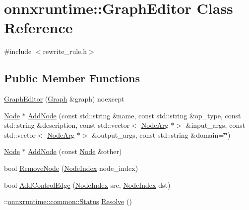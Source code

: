 \hypertarget{classonnxruntime_1_1GraphEditor}{}\section{onnxruntime\+:\+:Graph\+Editor Class Reference}
\label{classonnxruntime_1_1GraphEditor}


{\ttfamily \#include $<$rewrite\+\_\+rule.\+h$>$}

\subsection*{Public Member Functions}
\begin{DoxyCompactItemize}
\item 
\mbox{\hyperlink{classonnxruntime_1_1GraphEditor_a9386ce2eda03c33519102ecd1b1eabbc}{Graph\+Editor}} (\mbox{\hyperlink{classonnxruntime_1_1Graph}{Graph}} \&graph) noexcept
\item 
\mbox{\hyperlink{classonnxruntime_1_1Node}{Node}} $\ast$ \mbox{\hyperlink{classonnxruntime_1_1GraphEditor_aa2d4e6435f26f0661c9c5a8c6efd011e}{Add\+Node}} (const std\+::string \&name, const std\+::string \&op\+\_\+type, const std\+::string \&description, const std\+::vector$<$ \mbox{\hyperlink{classonnxruntime_1_1NodeArg}{Node\+Arg}} $\ast$$>$ \&input\+\_\+args, const std\+::vector$<$ \mbox{\hyperlink{classonnxruntime_1_1NodeArg}{Node\+Arg}} $\ast$$>$ \&output\+\_\+args, const std\+::string \&domain=\char`\"{}\char`\"{})
\item 
\mbox{\hyperlink{classonnxruntime_1_1Node}{Node}} $\ast$ \mbox{\hyperlink{classonnxruntime_1_1GraphEditor_ae7d6d60d1f59f87f932dc049d4c6a8d8}{Add\+Node}} (const \mbox{\hyperlink{classonnxruntime_1_1Node}{Node}} \&other)
\item 
bool \mbox{\hyperlink{classonnxruntime_1_1GraphEditor_a01082a28ba40bb25ae08e750993d6b76}{Remove\+Node}} (\mbox{\hyperlink{namespaceonnxruntime_af8773b5c12b5d8fd9292eb2e268df760}{Node\+Index}} node\+\_\+index)
\item 
bool \mbox{\hyperlink{classonnxruntime_1_1GraphEditor_ab8c53aca450ba7221343edb9c8f20926}{Add\+Control\+Edge}} (\mbox{\hyperlink{namespaceonnxruntime_af8773b5c12b5d8fd9292eb2e268df760}{Node\+Index}} src, \mbox{\hyperlink{namespaceonnxruntime_af8773b5c12b5d8fd9292eb2e268df760}{Node\+Index}} dst)
\item 
\+::\mbox{\hyperlink{classonnxruntime_1_1common_1_1Status}{onnxruntime\+::common\+::\+Status}} \mbox{\hyperlink{classonnxruntime_1_1GraphEditor_a801fa93d7efaff4d190e7328df390975}{Resolve}} ()
\end{DoxyCompactItemize}


